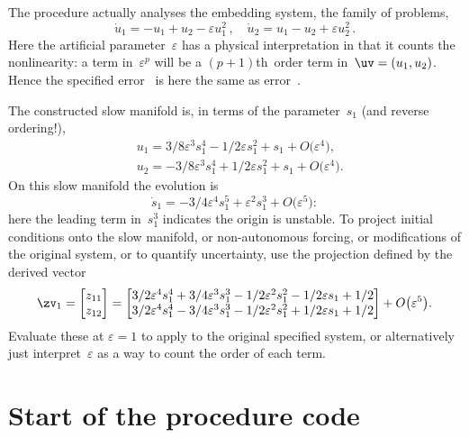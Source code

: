 \documentclass[11pt,a5paper]{article}
\def\eps{\varepsilon}
\begin{document}
The procedure actually analyses the embedding system, the
family of problems,
\begin{equation*}
\dot u_1=-u_1+u_2-\eps u_1^2\,, \quad 
\dot u_2=u_1-u_2+\eps u_2^2\,.
\end{equation*}
Here the artificial parameter~\(\eps\) has a physical
interpretation in that it counts the nonlinearity: a term
in~\(\eps^p\) will be a \((p+1)\)th~order term
in~\(\uv=(u_1,u_2)\). Hence the specified error~\Ord{\eps^5}
is here the same as error~.

The constructed slow manifold is, in terms of the
parameter~\(s_1\) (and reverse ordering!), 
\begin{align*}&
u_{1}=3/8 \eps^{3} s_{1}^{4}-1/2 \eps s_{1}^{2}+s_{1}
+O\big(\varepsilon ^{4}\big),
\\&
u_{2}=-3/8 \eps^{3} s_{1}^{4}+1/2 \eps s_{1}^{2}+s_{1}
+O\big(\varepsilon ^{4}\big).
\end{align*}
On this slow manifold the evolution is
\begin{equation*}
\dot s_{1}=-3/4 \eps^{4} s_{1}^{5}+\eps^{2} s_{1}^{3}
+O\big(\varepsilon ^{5}\big):
\end{equation*}
here the leading term in~\(s_1^3\) indicates the origin is
unstable. To project initial conditions onto the slow
manifold, or non-autonomous forcing, or modifications of the
original system, or to quantify uncertainty, use the
projection defined by the derived vector
\begin{equation*}
\zv_1=\begin{bmatrix}z_{11}\\z_{12}\end{bmatrix}
=\begin{bmatrix}
3/2 \eps^{4} s_{1}^{4}+3/4 \eps^{3} s_{1}^{3}-1/2 \eps^{2} s_{1}
^{2}-1/2 \eps s_{1}+1/2
\\
3/2 \eps^{4} s_{1}^{4}-3/4 \eps^{3} s_{1}^{3}-1/2 \eps^{2} s_{1}
^{2}+1/2 \eps s_{1}+1/2
\end{bmatrix}+O\big(\varepsilon ^{5}\big).
\end{equation*}
Evaluate these at \(\eps=1\) to apply to the original
specified system, or alternatively just interpret~\(\eps\) 
as a way to count the order of each term.




\section{Start of the procedure code}
\localtableofcontents
\end{document}
